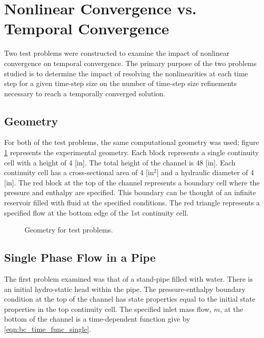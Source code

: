 \section{Nonlinear Convergence vs. Temporal Convergence}
\label{sect:nonlinear_temporal_convergence}

Two test problems were constructed to examine the impact of nonlinear convergence on temporal convergence.
The primary purpose of the two problems studied is to determine the impact of resolving the nonlinearities at each time step for a given time-step size on the number of time-step size refinements necessary to reach a temporally converged solution.

\subsection{Geometry}
\label{subsect:experimental_geometry}
For both of the test problems, the same computational geometry was used; figure \ref{fig:exp_geometry} represents the experimental geometry.
Each block represents a single continuity cell with a height of 4 [in].
The total height of the channel is 48 [in].
Each continuity cell has a cross-sectional area of 4 [in$^2$] and a hydraulic diameter of 4 [in].
The red block at the top of the channel represents a boundary cell where the pressure and enthalpy are specified.
This boundary can be thought of an infinite reservoir filled with fluid at the specified conditions.
The red triangle represents a specified flow at the bottom edge of the 1st continuity cell. 
\begin{figure}[h!t]
\caption{Geometry for test problems.}
\label{fig:exp_geometry}
\begin{center}
\end{center}
\end{figure}

\subsection{Single Phase Flow in a Pipe}
\label{subsect:single_numerical_experiment}
The first problem examined was that of a stand-pipe filled with water.
There is an initial hydro-static head within the pipe.
The pressure-enthalpy boundary condition at the top of the channel has state properties equal to the initial state properties in the top continuity cell.
The specified inlet mass flow, $\dot{m}$, at the bottom of the channel is a time-dependent function give by \eqref{eqn:bc_time_func_single}.

